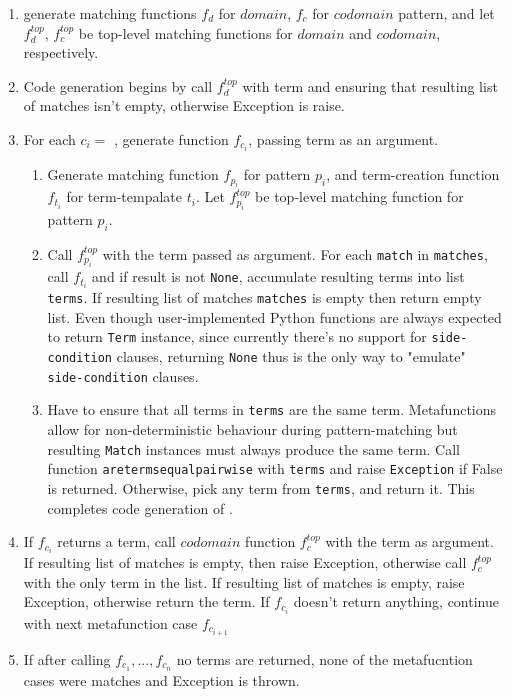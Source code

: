 \begin{enumerate}
\item generate matching functions $f_d$ for $domain$, $f_c$ for $codomain$ pattern, and let $f_d^{top}$, $f_c^{top}$ be top-level matching functions for $domain$ and $codomain$, respectively.
\item Code generation begins by call $f_d^{top}$ with term and ensuring that resulting list of matches isn't empty, otherwise Exception is raise.
\item For each $c_i =$ \MetafunctionCase, generate function $f_{c_i}$, passing term as an argument.
\begin{enumerate}
	\item Generate matching function $f_{p_i}$ for pattern $p_i$, and term-creation function $f_{t_i}$ for term-tempalate $t_i$. Let $f_{p_i}^{top}$ be top-level matching function for pattern $p_i$.
	\item Call $f_{p_i}^{top}$ with the term passed as argument. For each \texttt{match} in \texttt{matches}, call $f_{t_i}$ and if result is not \texttt{None}, accumulate resulting terms into list \texttt{terms}. If resulting list of matches \texttt{matches} is empty then return empty list. Even though user-implemented Python functions are always expected to return \texttt{Term} instance, since currently there's no support for \texttt{side-condition} clauses, returning \texttt{None} thus is the only way to "emulate" \texttt{side-condition} clauses. 
	\item Have to ensure that all terms in \texttt{terms} are the same term. Metafunctions allow for non-deterministic behaviour during pattern-matching but resulting \texttt{Match} instances must always produce the same term.  Call function \texttt{aretermsequalpairwise} with \texttt{terms} and raise \texttt{Exception} if False is returned. Otherwise, pick any term from \texttt{terms}, and return it.
	This completes code generation of \MetafunctionCase.
\end{enumerate}
\item If $f_{c_i}$ returns a term, call $codomain$ function $f_c^{top}$ with the term as argument. If resulting list of matches is empty, then raise Exception, otherwise call $f_c^{top}$ with the only term in the list. If resulting list of matches is empty, raise Exception, otherwise return the term. If $f_{c_i}$ doesn't return anything, continue with next metafunction case $f_{c_{i+1}}$
\item If after calling $f_{c_1}, ..., f_{c_n}$ no terms are returned, none of the metafucntion cases were matches and Exception is thrown.
\end{enumerate}

